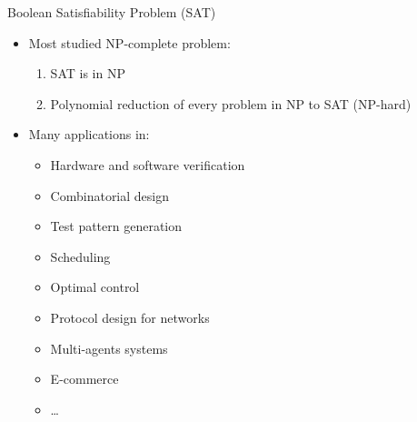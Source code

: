 \begin{frame}[c]{Boolean Satisfiability Problem (SAT)}

\begin{itemize}
  \item Most studied NP-complete problem:
  \begin{enumerate}
    \item SAT is in NP
    \item Polynomial reduction of every problem in NP to SAT (NP-hard)
  \end{enumerate}
  \pause
  \bigskip
  \item Many applications in:
  \begin{itemize}
    \item Hardware and software verification
    \item Combinatorial design
    \item Test pattern generation
    \item Scheduling
    \item Optimal control
    \item Protocol design for networks
    \item Multi-agents systems
    \item E-commerce
		\item \ldots
  \end{itemize}
\end{itemize}

\end{frame}
